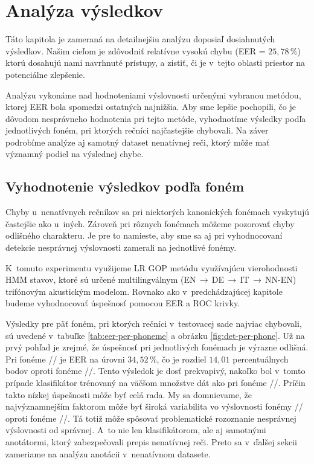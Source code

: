 \chapter{Analýza výsledkov} \label{cha:evaluation}

Táto kapitola je zameraná na detailnejšiu analýzu doposiaľ dosiahnutých výsledkov. Našim cieľom je zdôvodniť relatívne vysokú chybu (EER = $25{,}78\,\%$) ktorú dosahujú nami navrhnuté prístupy, a zistiť, či je v~tejto oblasti priestor na potenciálne zlepšenie. 

Analýzu vykonáme nad hodnoteniami výslovnosti určenými vybranou metódou, ktorej EER bola spomedzi ostatných najnižšia. Aby sme lepšie pochopili, čo je dôvodom nesprávneho hodnotenia pri tejto metóde, vyhodnotíme výsledky podľa jednotlivých foném, pri ktorých rečníci najčastejšie chybovali. Na záver podrobíme analýze aj samotný dataset nenatívnej reči, ktorý môže mať významný podiel na výslednej chybe.

\section{Vyhodnotenie výsledkov podľa foném}

Chyby u~nenatívnych rečníkov sa pri niektorých kanonických fonémach vyskytujú častejšie ako u~iných. Zároveň pri rôznych fonémach môžeme pozorovať chyby odlišného charakteru. Je pre to namieste, aby sme sa aj pri vyhodnocovaní detekcie nesprávnej výslovnosti zamerali na jednotlivé fonémy. 

K~tomuto experimentu využijeme LR GOP metódu využívajúcu vierohodnosti HMM stavov, ktoré sú určené multilingválnym (EN\,$\rightarrow$\,DE\,$\rightarrow$\,IT\,$\rightarrow$\,NN-EN) trifónovým akustickým modelom. Rovnako ako v~predchádzajúcej kapitole budeme vyhodnocovať úspešnosť pomocou EER a ROC krivky. 

Výsledky pre päť foném, pri ktorých rečníci v~testovacej sade najviac chybovali, 
sú uvedené v~tabuľke \ref{tab:eer-per-phoneme} a obrázku \ref{fig:det-per-phone}. 
Už na prvý pohľad je zrejmé, že úspešnosť pri jednotlivých fonémach je výrazne odlišná. Pri fonéme // je EER na úrovni $34{,}52\,\%$, čo je rozdiel $14{,}01$ percentuálnych bodov oproti fonéme //. Tento výsledok je dosť prekvapivý, nakoľko bol v~tomto prípade klasifikátor trénovaný na väčšom množstve dát ako pri fonéme //. Príčin takto nízkej úspešnosti môže byť celá rada. My sa domnievame, že najvýznamnejším faktorom môže byť široká variabilita vo výslovnosti fonémy // oproti fonéme //. Tá totiž môže spôsovať problematické rozoznanie nesprávnej výslovnosti od správnej. A~to nie len klasifikátorom, ale aj samotnými anotátormi, ktorý zabezpečovali prepis nenatívnej reči. Preto sa v~ďalšej sekcii zameriame na analýzu anotácii v~nenatívnom datasete.



